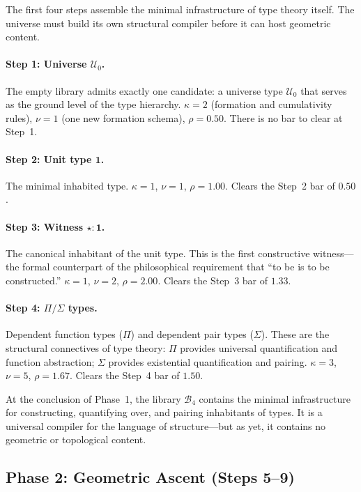 \documentclass[11pt,a4paper]{article}
\theoremstyle{plain}
\theoremstyle{definition}
\theoremstyle{remark}
\newcommand{\U}{\mathcal{U}}
\newcommand{\B}{\mathcal{B}}
\begin{document}
The first four steps assemble the minimal infrastructure of type theory itself.  The universe must build its own structural compiler before it can host geometric content.

\paragraph{Step 1: Universe $\U_0$.}  The empty library admits exactly one candidate: a universe type $\U_0$ that serves as the ground level of the type hierarchy.  $\kappa = 2$ (formation and cumulativity rules), $\nu = 1$ (one new formation schema), $\rho = 0.50$.  There is no bar to clear at Step~1.

\paragraph{Step 2: Unit type $\mathbf{1}$.}  The minimal inhabited type.  $\kappa = 1$, $\nu = 1$, $\rho = 1.00$.  Clears the Step~2 bar of $0.50$.

\paragraph{Step 3: Witness $\star : \mathbf{1}$.}  The canonical inhabitant of the unit type.  This is the first constructive witness---the formal counterpart of the philosophical requirement that ``to be is to be constructed.''  $\kappa = 1$, $\nu = 2$, $\rho = 2.00$.  Clears the Step~3 bar of $1.33$.

\paragraph{Step 4: $\Pi/\Sigma$ types.}  Dependent function types ($\Pi$) and dependent pair types ($\Sigma$).  These are the structural connectives of type theory: $\Pi$ provides universal quantification and function abstraction; $\Sigma$ provides existential quantification and pairing.  $\kappa = 3$, $\nu = 5$, $\rho = 1.67$.  Clears the Step~4 bar of $1.50$.

At the conclusion of Phase~1, the library $\B_4$ contains the minimal infrastructure for constructing, quantifying over, and pairing inhabitants of types.  It is a universal compiler for the language of structure---but as yet, it contains no geometric or topological content.


\subsection{Phase 2: Geometric Ascent (Steps 5--9)}
\label{sec:geometric-ascent}
\end{document}
